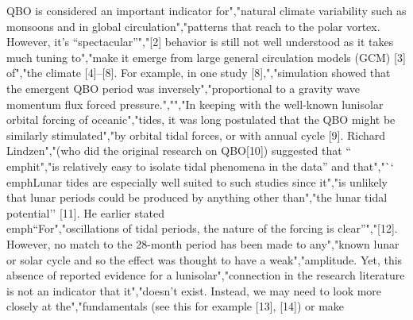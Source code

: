 {{{{{{{QBO is considered an important indicator for","natural climate variability such as monsoons and in global circulation","patterns that reach to the polar vortex. However, it's ``spectacular''","{[}2{]} behavior is still not well understood as it takes much tuning to","make it emerge from large general circulation models (GCM) {[}3{]} of","the climate {[}4{]}--{[}8{]}. For example, in one study {[}8{]},","simulation showed that the emergent QBO period was inversely","proportional to a gravity wave momentum flux forced pressure.","","In keeping with the well-known lunisolar orbital forcing of oceanic","tides, it was long postulated that the QBO might be similarly stimulated","by orbital tidal forces, or with annual cycle {[}9{]}. Richard Lindzen","(who did the original research on QBO{[}10{]}) suggested that ``\\emph{it","is relatively easy to isolate tidal phenomena in the data}'' and that","``\\emph{Lunar tides are especially well suited to such studies since it","is unlikely that lunar periods could be produced by anything other than","the lunar tidal potential}'' {[}11{]}. He earlier stated \\emph{``For","oscillations of tidal periods, the nature of the forcing is clear''}","{[}12{]}. However, no match to the 28-month period has been made to any","known lunar or solar cycle and so the effect was thought to have a weak","amplitude. Yet, this absence of reported evidence for a lunisolar","connection in the research literature is not an indicator that it","doesn't exist. Instead, we may need to look more closely at the","fundamentals (see this for example {[}13{]}, {[}14{]}) or make }}}}}}}
